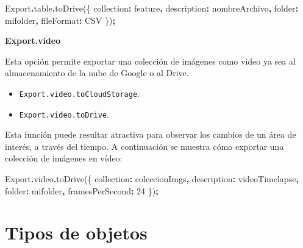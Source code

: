 \documentclass[
  12pt,
  letterpaper,
  twoside]{book}
\newenvironment{Shaded}{\begin{snugshade}}{\end{snugshade}}
\newcommand{\AttributeTok}[1]{\textcolor[rgb]{0.77,0.63,0.00}{#1}}
\newcommand{\DataTypeTok}[1]{\textcolor[rgb]{0.13,0.29,0.53}{#1}}
\newcommand{\DecValTok}[1]{\textcolor[rgb]{0.00,0.00,0.81}{#1}}
\newcommand{\FunctionTok}[1]{\textcolor[rgb]{0.00,0.00,0.00}{#1}}
\newcommand{\NormalTok}[1]{#1}
\newcommand{\OperatorTok}[1]{\textcolor[rgb]{0.81,0.36,0.00}{\textbf{#1}}}
\newcommand{\StringTok}[1]{\textcolor[rgb]{0.31,0.60,0.02}{#1}}
\providecommand{\tightlist}{%
  \setlength{\itemsep}{0pt}\setlength{\parskip}{0pt}}
\begin{document}
\begin{Shaded}
\begin{Highlighting}[]
\NormalTok{Export}\OperatorTok{.}\AttributeTok{table}\OperatorTok{.}\FunctionTok{toDrive}\NormalTok{(\{}
    \DataTypeTok{collection}\OperatorTok{:}\NormalTok{ feature}\OperatorTok{,}
    \DataTypeTok{description}\OperatorTok{:} \StringTok{\textquotesingle{}nombreArchivo\textquotesingle{}}\OperatorTok{,}
    \DataTypeTok{folder}\OperatorTok{:} \StringTok{\textquotesingle{}mifolder\textquotesingle{}}\OperatorTok{,}
    \DataTypeTok{fileFormat}\OperatorTok{:} \StringTok{\textquotesingle{}CSV\textquotesingle{}}
\NormalTok{ \})}\OperatorTok{;}
\end{Highlighting}
\end{Shaded}

\textbf{Export.video}

Esta opción permite exportar una colección de imágenes como video ya sea al almacenamiento de la nube de Google o al Drive.

\begin{itemize}
\tightlist
\item
  \texttt{Export.video.toCloudStorage}.
\item
  \texttt{Export.video.toDrive}.
\end{itemize}

Esta función puede resultar atractiva para observar los cambios de un área de interés, a través del tiempo. A continuación se muestra cómo exportar una colección de imágenes en vídeo:

\begin{Shaded}
\begin{Highlighting}[]
\NormalTok{Export}\OperatorTok{.}\AttributeTok{video}\OperatorTok{.}\FunctionTok{toDrive}\NormalTok{(\{}
    \DataTypeTok{collection}\OperatorTok{:}\NormalTok{ coleccionImgs}\OperatorTok{,}
    \DataTypeTok{description}\OperatorTok{:} \StringTok{\textquotesingle{}videoTimelapse\textquotesingle{}}\OperatorTok{,}
    \DataTypeTok{folder}\OperatorTok{:} \StringTok{\textquotesingle{}mifolder\textquotesingle{}}\OperatorTok{,}
    \DataTypeTok{framesPerSecond}\OperatorTok{:} \DecValTok{24}
\NormalTok{ \})}\OperatorTok{;}
\end{Highlighting}
\end{Shaded}

\newpage

\hypertarget{tipos-de-objetos}{%
\chapter{Tipos de objetos}\label{tipos-de-objetos}}
\end{document}
